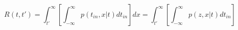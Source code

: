 \begin{equation}
R(t,t') = \int_{t'}^\infty \left[ \int_{-\infty}^\infty p(t_{in},x|t) dt_{in} \right]  dx = \int_{t'}^\infty \left[ \int_{-\infty}^\infty p(z,x|t) dt_{in} \right]
\end{equation}